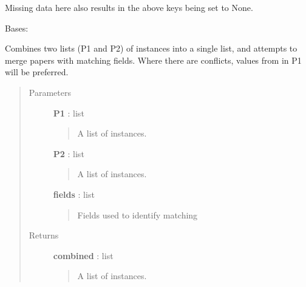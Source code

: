 \documentclass[letterpaper,10pt,english]{sphinxmanual}
\begin{document}
Missing data here also results in the above keys being set to None.

\begin{fulllineitems}
\label{tethne.readers:tethne.readers.DataError}
Bases: 

\end{fulllineitems}


\begin{fulllineitems}
\label{tethne.readers:tethne.readers.merge}
Combines two lists (P1 and P2) of {\hyperref[tethne.classes.paper:tethne.classes.paper.Paper]{}} instances into a single
list, and attempts to merge papers with matching fields. Where there are
conflicts, values from {\hyperref[tethne.classes.paper:tethne.classes.paper.Paper]{}} in P1 will be preferred.
\begin{quote}\begin{description}
\item[{Parameters}] \leavevmode
\textbf{P1} : list
\begin{quote}

A list of {\hyperref[tethne.classes.paper:tethne.classes.paper.Paper]{}} instances.
\end{quote}

\textbf{P2} : list
\begin{quote}

A list of {\hyperref[tethne.classes.paper:tethne.classes.paper.Paper]{}} instances.
\end{quote}

\textbf{fields} : list
\begin{quote}

Fields used to identify matching {\hyperref[tethne.classes.paper:tethne.classes.paper.Paper]{}}
\end{quote}

\item[{Returns}] \leavevmode
\textbf{combined} : list
\begin{quote}

A list of {\hyperref[tethne.classes.paper:tethne.classes.paper.Paper]{}} instances.
\end{quote}


\end{description}
\end{quote}
\end{fulllineitems}
\end{document}
